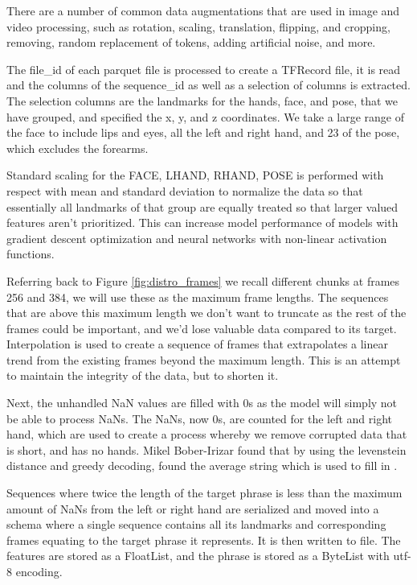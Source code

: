 \documentclass[preprint,11pt,review,authoryear]{elsarticle}
\begin{document}
There are a number of common data augmentations that are used in image and video processing, such as rotation, scaling, translation, flipping, and cropping, removing, random replacement of tokens, adding artificial noise, and more. 

The file\_id of each parquet file is processed to create a TFRecord file, it is read and the columns of the sequence\_id as well as a selection of columns is extracted. The selection columns are the landmarks for the hands, face, and pose, that we have grouped, and specified the x, y, and z coordinates. We take a large range of the face to include lips and eyes, all the left and right hand, and 23 of the pose, which excludes the forearms.

Standard scaling for the FACE, LHAND, RHAND, POSE is performed with respect with mean and standard deviation to normalize the data so that essentially all landmarks of that group are equally treated so that larger valued features aren't prioritized. This can increase model performance of models with gradient descent optimization and neural networks with non-linear activation functions.

Referring back to Figure \ref{fig:distro_frames} we recall different chunks at frames 256 and 384, we will use these as the maximum frame lengths. The sequences that are above this maximum length we don't want to truncate as the rest of the frames could be important, and we'd lose valuable data compared to its target. Interpolation is used to create a sequence of frames that extrapolates a linear trend from the existing frames beyond the maximum length. This is an attempt to maintain the integrity of the data, but to shorten it.

Next, the unhandled NaN values are filled with 0s as the model will simply not be able to process NaNs. The NaNs, now 0s, are counted for the left and right hand, which are used to create a process whereby we remove corrupted data that is short, and has no hands. Mikel Bober-Irizar found that by using the levenstein distance and greedy decoding, found the average string which is used to fill in \citep{mikelbober-irizarStaticGreedyBaseline}.

Sequences where twice the length of the target phrase is less than the maximum amount of NaNs from the left or right hand are serialized and moved into a schema where a single sequence contains all its landmarks and corresponding frames equating to the target phrase it represents. It is then written to file. The features are stored as a FloatList, and the phrase is stored as a ByteList with utf-8 encoding. 
\end{document}
